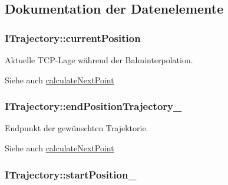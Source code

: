 \subsection{Dokumentation der Datenelemente}
\hypertarget{classITrajectory_ad0e7c293d6f0940523a158d4f898d366}{
\subsubsection[{current\-Position}]{\setlength{\rightskip}{0pt plus 5cm}I\-Trajectory\-::current\-Position\hspace{0.3cm}{\ttfamily [protected]}}}\label{classITrajectory_ad0e7c293d6f0940523a158d4f898d366}


Aktuelle T\-C\-P-\/\-Lage während der Bahninterpolation. 

\begin{DoxySeeAlso}{Siehe auch}
\hyperlink{classITrajectory_a7baff9fb2fc20987e9469d736a90406b}{calculate\-Next\-Point} 
\end{DoxySeeAlso}
\hypertarget{classITrajectory_ac49c42b8d8344554edb24d1ae525a64c}{
\subsubsection[{end\-Position\-Trajectory\-\_\-}]{\setlength{\rightskip}{0pt plus 5cm}I\-Trajectory\-::end\-Position\-Trajectory\-\_\-\hspace{0.3cm}{\ttfamily [protected]}}}\label{classITrajectory_ac49c42b8d8344554edb24d1ae525a64c}


Endpunkt der gewünschten Trajektorie. 

\begin{DoxySeeAlso}{Siehe auch}
\hyperlink{classITrajectory_a7baff9fb2fc20987e9469d736a90406b}{calculate\-Next\-Point} 
\end{DoxySeeAlso}
\hypertarget{classITrajectory_a4fe5238f588ac3ed157bebf0dd7d45f5}{
\subsubsection[{start\-Position\-\_\-}]{\setlength{\rightskip}{0pt plus 5cm}I\-Trajectory\-::start\-Position\-\_\-\hspace{0.3cm}{\ttfamily [protected]}}}\label{classITrajectory_a4fe5238f588ac3ed157bebf0dd7d45f5}


